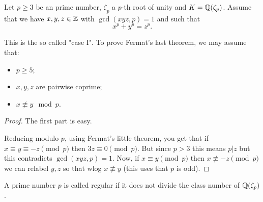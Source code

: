 \begin{lemma}\label{lemma:may_assume_coprime}
	\leanok

	Let $p \geq 3$ be an prime number, $\zeta_p$ a $p$-th root of unity and $K=\mathbb{Q}(\zeta_p)$.  Assume that we have $x,y,z \in \mathbb{Z}$ with $\gcd(xyz,p)=1$ and such that \[x^p+y^p=z^p.\]

	This is the so called "case I". To prove Fermat's last theorem, we may assume that:
	\begin{itemize}
		\item $p \geq 5$;
		\item $x,y,z$ are pairwise coprime;
		\item $x \not \equiv y \mod p$.
	\end{itemize}
\end{lemma}
\begin{proof}
	\leanok
	The first part is easy.

	Reducing modulo $p$, using Fermat's little theorem, you get that if $x \equiv y \equiv -z \pmod p$ then $3z \equiv 0 \pmod p$. But since $p >3$ this means $p |z$ but this contradicts $\gcd(xyz,p)=1$. Now, if $x \equiv y \pmod p$ then  $x \not \equiv -z \pmod p$ we can relabel $y,z$ so that wlog $x \not \equiv y$ (this uses that $p$ is odd).
\end{proof}

\begin{definition}\label{defn:is_regular_number}
	\leanok
	A prime number $p$ is called regular if it does not divide the class number of $\mathbb{Q}(\zeta_p)$.
\end{definition}


